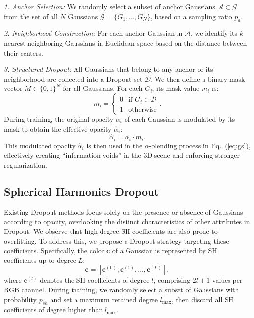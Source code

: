 \noindent \textit{1. Anchor Selection:} We randomly select a subset of anchor Gaussians $ \mathcal{A} \subset \mathcal{G} $ from the set of all $ N $ Gaussians $ \mathcal{G} = \{G_1, \dots, G_N\} $, based on a sampling ratio $ p_a $. 
%

\noindent \textit{2. Neighborhood Construction:} For each anchor Gaussian in $\mathcal{A}$, we identify its $k$ nearest neighboring Gaussians in Euclidean space based on the distance between their centers. 

\noindent \textit{3. Structured Dropout:} All Gaussians that belong to any anchor or its neighborhood are collected into a Dropout set $\mathcal{D}$.
% 
We then define a binary mask vector $M \in \{0,1\}^N$ for all Gaussians. For each $G_i$, its mask value $m_i$ is:
\begin{equation}
    m_i = \begin{cases} 0 & \text{if } G_i \in \mathcal{D} \\ 1 & \text{otherwise} \end{cases}.
    \label{eq:gs_mask}
\end{equation}
%
During training, the original opacity $\alpha_i$ of each Gaussian is modulated by its mask to obtain the effective opacity $\hat{\alpha}_i$:
\begin{equation}
    \hat{\alpha}_i = \alpha_i \cdot m_i.
    \label{eq:new_opacity}
\end{equation}
%
This modulated opacity $\hat{\alpha}_i$ is then used in the $\alpha$-blending process in Eq.~(\ref{eq:gs}), effectively creating “information voids” in the 3D scene and enforcing stronger regularization.

\subsection{Spherical Harmonics Dropout}
 Existing Dropout methods focus solely on the presence or absence of Gaussians according to opacity, overlooking the distinct characteristics of other attributes in Dropout. 
We observe that high-degree SH coefficients are also prone to overfitting. To address this, we propose a Dropout strategy targeting these coefficients.
%
Specifically, the color $\mathbf{c}$ of a Gaussian is represented by SH coefficients up to degree $L$:
\begin{equation}
\mathbf{c} = [\mathbf{c}^{(0)}, \mathbf{c}^{(1)}, \dots, \mathbf{c}^{(L)}],
\end{equation}
where $\mathbf{c}^{(l)}$ denotes the SH coefficients of degree $l$, comprising $ 2l+1 $ values per RGB channel. 
% 
During training, we randomly select a subset of Gaussians with probability $ p_{sh} $ and set a maximum retained degree $ l_{\text{max}} $, then discard all SH coefficients of degree higher than $ l_{\text{max}} $.


